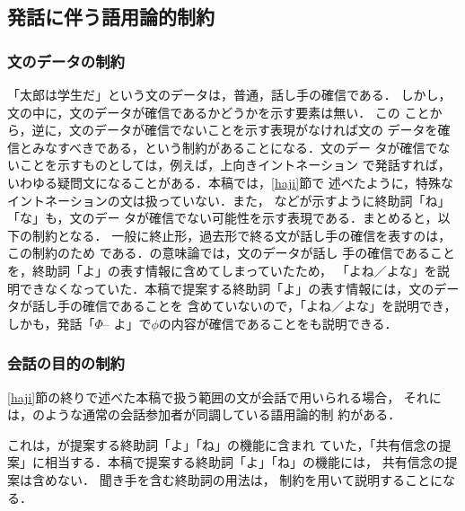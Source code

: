 \subsection{発話に伴う語用論的制約}
\subsubsection{文のデータの制約}
「太郎は学生だ」という文のデータは，普通，話し手の確信である．  しかし，
{\dg 文の中に，文のデータが確信であるかどうかを示す要素は無い}．  この
ことから，逆に，文のデータが確信でないことを示す表現がなければ文の
データを確信とみなすべきである，という制約があることになる．文のデー
タが確信でないことを示すものとしては，例えば，上向きイントネーション
で発話すれば，いわゆる疑問文になることがある．本稿では，\ref{haji}節で
述べたように，特殊なイントネーションの文は扱っていない．また，
\cite{kamio90}などが示すように終助詞「ね」「な」も，文のデー
タが確信でない可能性を示す表現である．まとめると，以下の制約となる．
一般に終止形，過去形で終る文が話し手の確信を表すのは，この制約のため
である．\cite{kawamori91}の意味論では，文のデータが話し
手の確信であることを，終助詞「よ」の表す情報に含めてしまっていたため，
「よね／よな」を説明できなくなっていた．本稿で提案する終助詞「よ」の表す情報には，文のデータが話し手の確信であることを
含めていないので，「よね／よな」を説明でき，しかも，発話「\(\Phi\)--
よ」で\(\phi\)の内容が確信であることをも説明できる．
\subsubsection{会話の目的の制約}
\ref{haji}節の終りで述べた本稿で扱う範囲の文が会話で用いられる場合，
それには，のような通常の会話参加者が同調している語用論的制
約がある．

これは，\cite{katagiri93}が提案する終助詞「よ」「ね」の機能に含まれ
ていた，「共有信念の提案」に相当する．本稿で提案する終助詞「よ」「ね」の機能には，
共有信念の提案は含めない．  聞き手を含む終助詞の用法は，
制約を用いて説明することになる．

